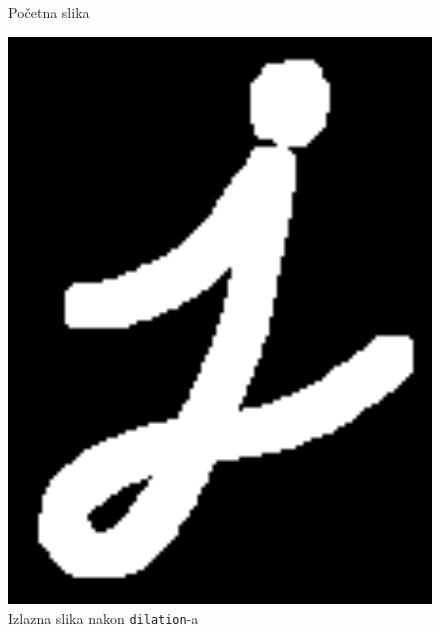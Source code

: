 \documentclass[fontsize=12bp, paper=a4]{scrarticle}
\begin{document}
\begin{figure}[tbp!]
\begin{minipage}[b]{0.25\textwidth}
        \caption{\centering Početna slika}
    \end{minipage}
    \begin{minipage}[b]{0.25\textwidth}
        \includegraphics[width=1\textwidth]{4.png}
        \caption{\centering Izlazna slika nakon \texttt{dilation}-a}
    \end{minipage}
\end{figure}  
\end{document}
